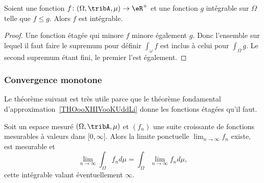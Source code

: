 \begin{proposition}      \label{PROPooGTMVooPHcrRl}
    Soient une fonction \( f\colon (\Omega,\tribA,\mu)\to \eR^+\) et une fonction \( g\) intégrable sur \( \Omega\) telle que \( f\leq g\). Alors \( f\) est intégrable.
\end{proposition}

\begin{proof}
    Une fonction étagée qui minore \( f\) minore également \( g\). Donc l'ensemble sur lequel il faut faire le supremum pour définir \( \int_{\omega}f\) est inclus à celui pour \( \int_{\Omega}g\). Le second supremum étant fini, le premier l'est également.
\end{proof}

\subsubsection{Convergence monotone}

Le théorème suivant est très utile parce que le théorème fondamental d'approximation~\ref{THOooXHIVooKUddLi} donne les fonctions étagées qu'il faut.

\begin{theorem} \label{ThoRRDooFUvEAN}
    Soit un espace mesuré \( (\Omega,\tribA,\mu)\) et \( (f_n)\) une suite croissante de fonctions mesurables à valeurs dans \( \mathopen[ 0 , \infty \mathclose]\). Alors la limite ponctuelle \( \lim_{n\to \infty} f_n\) existe, est mesurable et
    \begin{equation}    \label{EqFHqCmLV}
        \lim_{n\to \infty} \int_{\Omega}f_nd\mu= \int_{\Omega}\lim_{n\to \infty} f_nd\mu,
    \end{equation}
    cette intégrable valant éventuellement \( \infty\).
\end{theorem}


